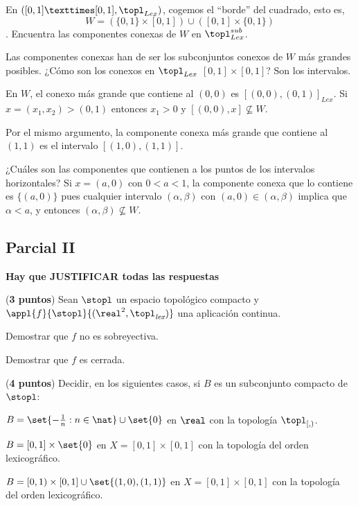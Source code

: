 \begin{problem} En $([0,1]×[0,1], \topl_{Lex})$, cogemos el ``borde'' del cuadrado, esto es, \[W = \left(\{0,1\} × [0,1]\right) ∪ \left([0,1] × \{0,1\}\right) \]. Encuentra las componentes conexas de $W$ en $\topl_{Lex}^{sub}$.
\solution

Las componentes conexas han de ser los subconjuntos conexos de $W$ más grandes posibles. ¿Cómo son los conexos en $\topl_{Lex}$ $[0,1]×[0,1]$? Son los intervalos.

En $W$, el conexo más grande que contiene al $(0,0)$ es $[(0,0), (0,1)]_{Lex}$. Si $x = (x_1, x_2) > (0,1)$ entonces $x_1 > 0$ y $[(0,0), x] \nsubseteq W$.

Por el mismo argumento, la componente conexa más grande que contiene al $(1,1)$ es el intervalo $[(1,0), (1,1)]$.

¿Cuáles son las componentes que contienen a los puntos de los intervalos horizontales? Si $x = (a,0)$ con $0<a<1$, la componente conexa que lo contiene es $\{(a,0)\}$ pues cualquier intervalo $(α,β)$ con $(a,0) ∈ (α,β)$ implica que $α < a$, y entonces $(α,β) \nsubseteq W$.
\end{problem}


\newpage
\subsection{Parcial II}
{\bf Hay que JUSTIFICAR todas las respuestas}

\begin{problem}[1] ({\bf 3 puntos}) Sean $\stopl$ un espacio topológico compacto y $\appl{f}{\stopl}{(\real^2, \topl_{\textit{lex}})}$ una aplicación continua.

\ppart Demostrar que $f$ no es sobreyectiva.

\ppart Demostrar que $f$ es cerrada.

\solution
\end{problem}


\begin{problem} ({\bf 4 puntos}) Decidir, en los siguientes casos, si $B$ es un subconjunto compacto de $\stopl$:

\ppart ${B = \set{-\frac{1}{n} : n \in \nat} \cup \set{0}}$ en $\real$ con la topología $\topl_{[,)}$.

\ppart ${B = [0,1] \times \set{0} }$ en ${X = [0,1] \times [0,1] }$ con la topología del orden lexicográfico.

\ppart ${B = [0,1) \times [0,1] \cup \set{(1,0), (1,1)} }$ en ${X = [0,1] \times [0,1] }$ con la topología del orden lexicográfico.

\solution
\end{problem}


